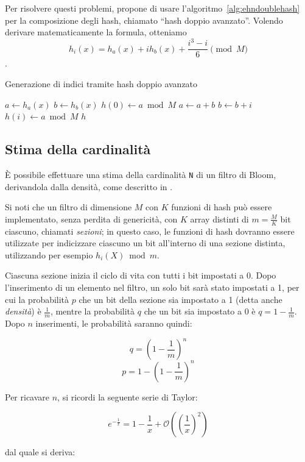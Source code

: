 Per risolvere questi problemi, \cite{bloomdoublehash} propone di usare
l'algoritmo~\ref{alg:ehndoublehash} per la composizione degli hash, chiamato  ``hash doppio
avanzato''. Volendo derivare matematicamente la formula, otteniamo $$ h_i(x) = h_a(x) + ih_b(x) +
\frac{i^3-i}{6} \pmod M $$.

\begin{algorithm}
\caption{Generazione di indici tramite hash doppio avanzato}
\label{alg:ehndoublehash}
\begin{algorithmic}[1]
	\State $a \gets h_a(x)$
	\State $b \gets h_b(x)$
	\State $h(0) \gets a \bmod M$
		\State $a \gets a+b$
		\State $b \gets b+i$
		\State $h(i) \gets a \bmod M$
	\EndFor
	\State \Return $h$
\EndProcedure
\end{algorithmic}
\end{algorithm}

\subsection{Stima della cardinalità}
\label{sec:bloomcard}

È possibile effettuare una stima della cardinalità \verb|N| di un filtro di Bloom, derivandola
dalla densità, come descritto in \cite{bloomscalable}.

Si noti che un filtro di dimensione $M$ con $K$ funzioni di hash può essere implementato, senza
perdita di genericità, con $K$ array distinti di $m=\frac{M}{K}$ bit ciascuno, chiamati
\emph{sezioni}; in questo caso, le funzioni di hash dovranno essere utilizzate per indicizzare
ciascuno un bit all'interno di una sezione distinta, utilizzando per esempio $h_i(X) \bmod m$.

Ciascuna sezione inizia il ciclo di vita con tutti i bit impostati a 0. Dopo l'inserimento di un
elemento nel filtro, un solo bit sarà stato impostati a 1, per cui la probabilità $p$ che un bit
della sezione sia impostato a 1 (detta anche \emph{densità}) è $\frac{1}{m}$, mentre la probabilità
$q$ che un bit sia impostato a 0 è $ q=1-\frac{1}{m}$. Dopo $n$ inserimenti, le probabilità saranno
quindi: 

$$ q = (1-\frac{1}{m})^n $$
$$ p = 1-(1-\frac{1}{m})^n $$

Per ricavare $n$, si ricordi la seguente serie di Taylor:

$$ e^{-\frac{1}{x}} = 1 - \frac{1}{x} + \mathcal{O}((\frac{1}{x})^2) $$

dal quale si deriva:


